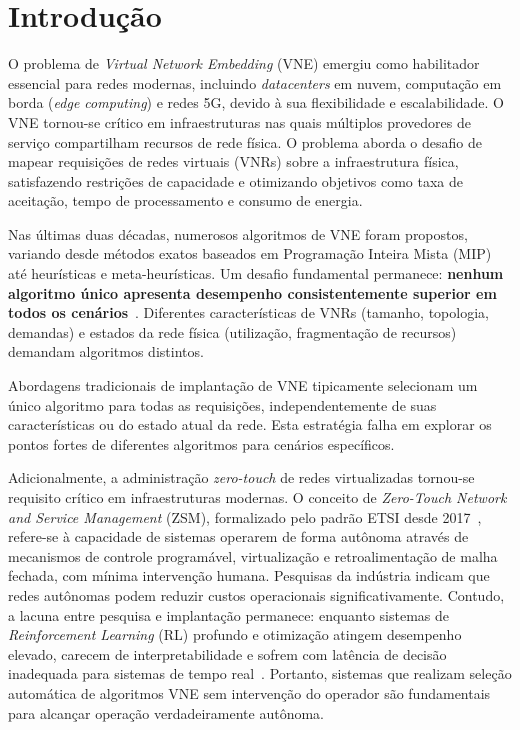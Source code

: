 \documentclass[conference]{IEEEtran}
\begin{document}

\section{Introdução}
\label{sec:Intro}

O problema de \textit{Virtual Network Embedding} (VNE) emergiu como habilitador essencial para redes modernas, incluindo \textit{datacenters} em nuvem, computação em borda (\textit{edge computing}) e redes 5G, devido à sua flexibilidade e escalabilidade. O VNE tornou-se crítico em infraestruturas nas quais múltiplos provedores de serviço compartilham recursos de rede física. O problema aborda o desafio de mapear requisições de redes virtuais (VNRs) sobre a infraestrutura física, satisfazendo restrições de capacidade e otimizando objetivos como taxa de aceitação, tempo de processamento e consumo de energia.

Nas últimas duas décadas, numerosos algoritmos de VNE foram propostos, variando desde métodos exatos baseados em Programação Inteira Mista (MIP) até heurísticas e meta-heurísticas.
Um desafio fundamental permanece: \textbf{nenhum algoritmo único apresenta desempenho consistentemente superior em todos os cenários}~\cite{fischer2013vne-survey}.
Diferentes características de VNRs (tamanho, topologia, demandas) e estados da rede física (utilização, fragmentação de recursos) demandam algoritmos distintos.

Abordagens tradicionais de implantação de VNE tipicamente selecionam um único algoritmo para todas as requisições, independentemente de suas características ou do estado atual da rede. Esta estratégia falha em explorar os pontos fortes de diferentes algoritmos para cenários específicos.

Adicionalmente, a administração \textit{zero-touch} de redes virtualizadas tornou-se requisito crítico em infraestruturas modernas.
O conceito de \textit{Zero-Touch Network and Service Management} (ZSM), formalizado pelo padrão ETSI desde 2017~\cite{etsi-zsm}, refere-se à capacidade de sistemas operarem de forma autônoma através de mecanismos de controle programável, virtualização e retroalimentação de malha fechada, com mínima intervenção humana.
Pesquisas da indústria indicam que redes autônomas podem reduzir custos operacionais significativamente.
Contudo, a lacuna entre pesquisa e implantação permanece: enquanto sistemas de \textit{Reinforcement Learning} (RL) profundo e otimização atingem desempenho elevado, carecem de interpretabilidade e sofrem com latência de decisão inadequada para sistemas de tempo real~\cite{white2024zerotough}.
Portanto, sistemas que realizam seleção automática de algoritmos VNE sem intervenção do operador são fundamentais para alcançar operação verdadeiramente autônoma.
\end{document}
